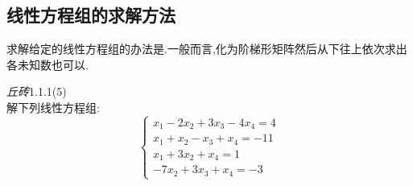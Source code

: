 \documentclass{ctexart}
\begin{document}
\subsection{线性方程组的求解方法}
\begin{theorem}[线性方程组的求解]
    求解给定的线性方程组的办法是.一般而言,化为阶梯形矩阵然后从下往上依次求出各未知数也可以.
\end{theorem}
\begin{problem}\textit{丘砖}1.1.1(5)\\
    解下列线性方程组:
    \[\left\{\begin{array}{l}
        x_1-2x_2+3x_3-4x_4=4\\
        x_1+x_2-x_3+x_4=-11\\
        x_1+3x_2+x_4=1\\
        -7x_2+3x_3+x_4=-3
    \end{array}\right.\]
\end{problem}
\end{document}
